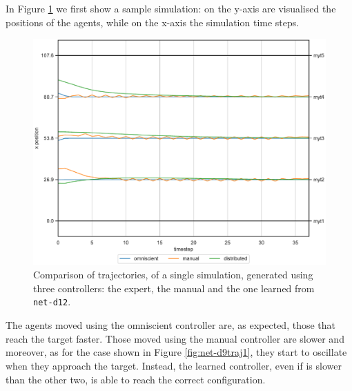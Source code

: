 In Figure \ref{fig:net-d12traj1} we first show a sample simulation: on the y-axis 
are visualised the positions of the agents, while on the x-axis the simulation time 
steps. 
\begin{figure}[!htb]
	\centering
	\includegraphics[width=.7\textwidth]{contents/images/net-d12/animation-distributed}%
	\caption[Evaluation of the trajectories obtained with 5 agents.]{Comparison of 
	trajectories, of a single simulation, generated using three 
		controllers: the expert, the manual and the one learned from 
		\texttt{net-d12}.}
	\label{fig:net-d12traj1}
\end{figure}
The agents moved using the omniscient controller are, as expected, those that 
reach the target faster. Those moved using the manual controller are slower and 
moreover, as for the case shown in Figure \ref{fig:net-d9traj1}, they start to 
oscillate when they approach the target. Instead, the learned controller, even if is 
slower than the other two, is able to reach the correct configuration. 

